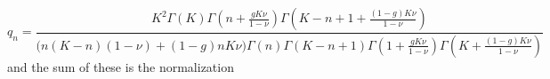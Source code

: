 \begin{equation}%
q_n = \frac{ K^2\Gamma(K) \Gamma\left(n+\frac{g K\nu}{1-\nu}\right) \Gamma\left(K-n+1+\frac{(1-g) K\nu}{1-\nu}\right) }{ \big(n(K-n)(1-\nu)+(1-g)n K\nu\big) \Gamma(n) \Gamma(K-n+1) \Gamma\left(1+\frac{g K\nu}{1-\nu}\right) \Gamma\left(K+\frac{(1-g) K\nu}{1-\nu}\right)}
\end{equation}
and the sum of these is the normalization
